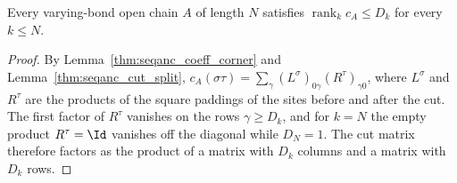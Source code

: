 \begin{lemma}
    \label{thm:seqanc_cut_rank_lower}
    \leanok
    Every varying-bond open chain $A$ of length $N$ satisfies
    $\operatorname{rank}_k c_A\le D_k$ for every $k\le N$.
\end{lemma}
\begin{proof}
    \leanok
    By Lemma~\ref{thm:seqanc_coeff_corner} and
    Lemma~\ref{thm:seqanc_cut_split},
    $c_A(\sigma\tau)=\sum_{\gamma}(L^\sigma)_{0\gamma}(R^\tau)_{\gamma 0}$, where
    $L^\sigma$ and $R^\tau$ are the products of the square paddings of the
    sites before and after the cut. The first factor of $R^\tau$ vanishes on
    the rows $\gamma\ge D_k$, and for $k=N$ the empty product $R^\tau=\Id$
    vanishes off the diagonal while $D_N=1$. The cut matrix therefore factors as the product
    of a matrix with $D_k$ columns and a matrix with $D_k$ rows.
\end{proof}

